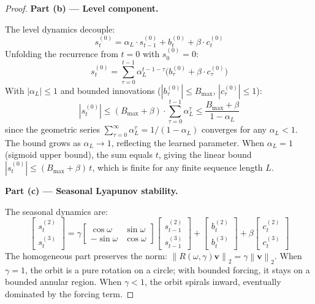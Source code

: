 \documentclass[11pt]{article}
\newcommand{\norm}[1]{\left\lVert#1\right\rVert}
\begin{document}
\begin{proof}
\textbf{Part (b) — Level component.}

The level dynamics decouple:
\[
s_t^{(0)} = \alpha_L \cdot s_{t-1}^{(0)} + b_t^{(0)} + \beta \cdot c_t^{(0)}
\]
Unfolding the recurrence from $t=0$ with $s_0^{(0)} = 0$:
\[
s_t^{(0)} = \sum_{\tau=0}^{t-1} \alpha_L^{t-1-\tau} \big(b_\tau^{(0)} + \beta \cdot c_\tau^{(0)}\big)
\]
With $|\alpha_L| \leq 1$ and bounded innovations ($|b_\tau^{(0)}| \leq B_{\max}$, $|c_\tau^{(0)}| \leq 1$):
\[
|s_t^{(0)}| \leq (B_{\max} + \beta) \cdot \sum_{\tau=0}^{t-1} \alpha_L^\tau
\leq \frac{B_{\max} + \beta}{1 - \alpha_L}
\]
since the geometric series $\sum_{\tau=0}^{\infty} \alpha_L^\tau = 1/(1-\alpha_L)$ converges for any $\alpha_L < 1$. The bound grows as $\alpha_L \to 1$, reflecting the learned parameter. When $\alpha_L = 1$ (sigmoid upper bound), the sum equals $t$, giving the linear bound $|s_t^{(0)}| \leq (B_{\max} + \beta)\,t$, which is finite for any finite sequence length $L$.

\textbf{Part (c) — Seasonal Lyapunov stability.}

The seasonal dynamics are:
\[
\begin{bmatrix} s_t^{(2)} \\ s_t^{(3)} \end{bmatrix}
= \gamma \begin{bmatrix} \cos\omega & \sin\omega \\ -\sin\omega & \cos\omega \end{bmatrix}
\begin{bmatrix} s_{t-1}^{(2)} \\ s_{t-1}^{(3)} \end{bmatrix}
+ \begin{bmatrix} b_t^{(2)} \\ b_t^{(3)} \end{bmatrix}
+ \beta \begin{bmatrix} c_t^{(2)} \\ c_t^{(3)} \end{bmatrix}
\]
The homogeneous part preserves the norm: $\norm{R(\omega,\gamma) \mathbf{v}}_2 = \gamma \norm{\mathbf{v}}_2$. When $\gamma = 1$, the orbit is a pure rotation on a circle; with bounded forcing, it stays on a bounded annular region. When $\gamma < 1$, the orbit spirals inward, eventually dominated by the forcing term.
\end{proof}
\end{document}
